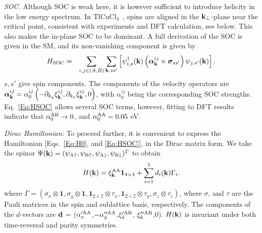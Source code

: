\documentclass[aps,prl,showpacs,twocolumn,groupedaddress]{revtex4-1}
\newcommand{\TCC}{TlCuCl$_3$~}
\newcommand{\blue}{\textcolor{black}}
\begin{document}

{\it SOC.} Although SOC is weak here, it is however sufficient to introduce helicity in the low energy spectrum. In \TCC, spins are aligned in the ${\bf k}_{\perp}$-plane near the critical point, consistent with experiments\cite{pm1,pressure1,pressure2,mag1} and DFT calculation, see below. This also makes the in-plane SOC to be dominant. A full derivation of the SOC is given in the SM\cite{SM}, and its non-vanishing component is given by
%
\begin{eqnarray}
H_{\rm SOC}&=&\sum_{i,j\in (A,B)}\sum_{{\bf k},ss'}\left[\psi^{\dag}_{i,s}({\bf k})\left({\bm \alpha}^{ij}_{\bf k}\times {\bm \sigma}_{ss'}\right)\psi_{j,s'}({\bf k}) \right].
\label{Eq:HSOC}
\end{eqnarray}
$s,s'$ give spin components. The components of the velocity operators are ${\bm \alpha}^{ij}_{\bf k} =\alpha^{ij}_0\left(-\partial_{k_y} \xi^{ij}_{\bf k},\partial_{k_x} \xi^{ij}_{\bf k},0\right)$, with $\alpha^{ij}_0$ being the corresponding SOC strengths. Eq.~\ref{Eq:HSOC} allows several SOC terms, however, fitting to DFT results indicate that $\alpha^{\rm AB}_0\rightarrow 0$, and $\alpha^{\rm AA}_0=0.05$ eV.\blue{\cite{foot_TBfit}}

{\it Dirac Hamiltonian:} To proceed further, it is convenient to express the Hamiltonian [Eqs.~\ref{Eq:H0}, and \ref{Eq:HSOC}], in the Dirac matrix form. We take the spinor $\Psi({\bf k}) = (\psi_{{\rm A}\uparrow}, \psi_{{\rm B}\uparrow}, \psi_{{\rm A}\downarrow}, \psi_{{\rm B}\downarrow})^{T}$ to obtain
\begin{eqnarray}
H({\bf k})=\xi^{\rm AA}_{\bf k}\mathbf{1}_{4\times 4}+ \sum_{i=1}^{5} d_i({\bf k})\Gamma_i.
\label{ham}
\end{eqnarray}
where $\Gamma=(\sigma_x\otimes\mathbf{1},\sigma_y\otimes\mathbf{1},\mathbf{1}_{2\times 2}\otimes\tau_x,\mathbf{1}_{2\times 2}\otimes\tau_y,\sigma_z\otimes\tau_z)$, where $\sigma$, and $\tau$ are the Pauli matrices in the spin and sublattice basis, respectively. The components of the $d$-vectors are ${\bf d}$ = ($\alpha'^{\rm AA}_x$,$-\alpha''^{\rm AA}_y$,$\xi'^{\rm AB}_k$, $\xi''^{\rm AB}_k$,0). $H({\bf k})$ is invariant under both time-reversal and parity symmetries.\cite{footparity}
\end{document}
